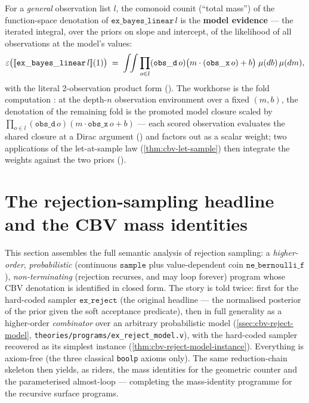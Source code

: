 \begin{theorem}%
\label{thm:cbv-bayes-evidence}
\rocqok
{}\rocqok
{}\rocqok
{}
For a \emph{general} observation list $l$, the comonoid counit
(``total mass'') of the function-space denotation of
$\mathtt{ex\_bayes\_linear}\,l$ is the \textbf{model evidence} ---
the iterated integral, over the priors on slope and intercept, of the
likelihood of all observations at the model's values:
\[
  \varepsilon\bigl([\![ \mathtt{ex\_bayes\_linear}\,l ]\!](1)\bigr)
  \;=\;
  \int\!\!\int
    \prod_{o \in l} (\mathtt{obs\_d}\,o)
      \bigl(m \cdot (\mathtt{obs\_x}\,o) + b\bigr)
  \;\mu(db)\,\mu(dm),
\]
with the literal 2-observation product form
().
The workhorse is the fold computation
: at the
depth-$n$ observation environment over a fixed $(m, b)$, the
denotation of the remaining fold is the promoted model closure scaled
by $\prod_{o \in l}(\mathtt{obs\_d}\,o)(m \cdot \mathtt{obs\_x}\,o +
b)$ --- each scored observation evaluates the shared closure at a
Dirac argument
() and factors
out as a scalar weight; two applications of the let-at-sample law
(\autoref{thm:cbv-let-sample}) then integrate the weights against the
two priors
().
\end{theorem}

\section{The rejection-sampling headline and the CBV mass identities}%
\label{sec:cbv-geom-mass}

This section assembles the full semantic analysis of rejection
sampling: a \emph{higher-order}, \emph{probabilistic} (continuous
$\mathtt{sample}$ plus value-dependent coin $\mathtt{ne\_bernoulli\_f}$),
\emph{non-terminating} (rejection recurses, and may loop forever)
program whose CBV denotation is identified in closed form. The story
is told twice: first for the hard-coded sampler $\mathtt{ex\_reject}$
(the original headline --- the normalised posterior of the prior
given the soft acceptance predicate), then in full generality as a
higher-order \emph{combinator} over an arbitrary probabilistic model
(\autoref{ssec:cbv-reject-model},
\texttt{theories/programs/ex\_reject\_model.v}), with the hard-coded
sampler recovered as its simplest instance
(\autoref{thm:cbv-reject-model-instance}). Everything is
axiom-free (the three classical \texttt{boolp} axioms only). The same
reduction-chain skeleton then yields, as riders, the mass identities
for the geometric counter and the parameterised almost-loop ---
completing the mass-identity programme for the recursive surface
programs.

